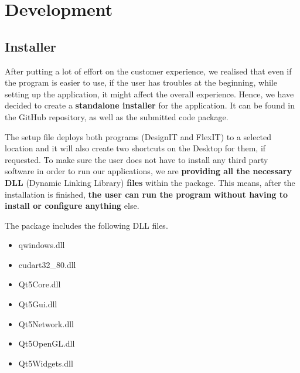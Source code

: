 \documentclass[a4paper, 11pt, article]{report}
\begin{document}

\chapter{Development}

\section{Installer}

After putting a lot of effort on the customer experience, we realised that even if the program is easier to use, if the user has troubles at the beginning, while setting up the application, it might affect the overall experience. Hence, we have decided to create a \textbf{standalone installer} for the application. It can be found in the GitHub repository, as well as the submitted code package.

The setup file deploys both programs (DesignIT and FlexIT) to a selected location and it will also create two shortcuts on the Desktop for them, if requested. To make sure the user does not have to install any third party software in order to run our applications, we are \textbf{providing all the necessary DLL} (Dynamic Linking Library) \textbf{files} within the package. This means, after the installation is finished, \textbf{the user can run the program without having to install or configure anything} else.

The package includes the following DLL files.

\begin{itemize}
\item qwindows.dll
\item cudart32\_80.dll
\item Qt5Core.dll
\item Qt5Gui.dll
\item Qt5Network.dll
\item Qt5OpenGL.dll
\item Qt5Widgets.dll
\end{itemize}
\end{document}
